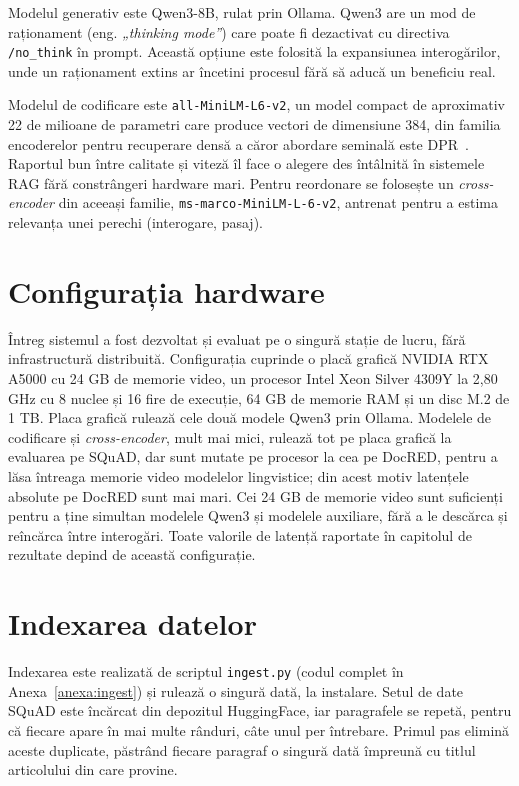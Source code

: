 Modelul generativ este Qwen3-8B, rulat prin Ollama. Qwen3 are un mod de raționament (eng. \textit{„thinking mode”}) care poate fi dezactivat cu directiva \texttt{/no\_think} în prompt. Această opțiune este folosită la expansiunea interogărilor, unde un raționament extins ar încetini procesul fără să aducă un beneficiu real.

Modelul de codificare este \texttt{all-MiniLM-L6-v2}, un model compact de aproximativ 22 de milioane de parametri care produce vectori de dimensiune 384, din familia encoderelor pentru recuperare densă a căror abordare seminală este DPR~\cite{karpukhin2020dpr}. Raportul bun între calitate și viteză îl face o alegere des întâlnită în sistemele RAG fără constrângeri hardware mari. Pentru reordonare se folosește un \textit{cross-encoder} din aceeași familie, \texttt{ms-marco-MiniLM-L-6-v2}, antrenat pentru a estima relevanța unei perechi (interogare, pasaj).

\section{Configurația hardware}
\label{sec:hardware}

Întreg sistemul a fost dezvoltat și evaluat pe o singură stație de lucru, fără infrastructură distribuită. Configurația cuprinde o placă grafică NVIDIA RTX A5000 cu 24 GB de memorie video, un procesor Intel Xeon Silver 4309Y la 2,80 GHz cu 8 nuclee și 16 fire de execuție, 64 GB de memorie RAM și un disc M.2 de 1 TB. Placa grafică rulează cele două modele Qwen3 prin Ollama. Modelele de codificare și \textit{cross-encoder}, mult mai mici, rulează tot pe placa grafică la evaluarea pe SQuAD, dar sunt mutate pe procesor la cea pe DocRED, pentru a lăsa întreaga memorie video modelelor lingvistice; din acest motiv latențele absolute pe DocRED sunt mai mari. Cei 24 GB de memorie video sunt suficienți pentru a ține simultan modelele Qwen3 și modelele auxiliare, fără a le descărca și reîncărca între interogări. Toate valorile de latență raportate în capitolul de rezultate depind de această configurație.

\section{Indexarea datelor}

Indexarea este realizată de scriptul \texttt{ingest.py} (codul complet în Anexa~\ref{anexa:ingest}) și rulează o singură dată, la instalare. Setul de date SQuAD este încărcat din depozitul HuggingFace, iar paragrafele se repetă, pentru că fiecare apare în mai multe rânduri, câte unul per întrebare. Primul pas elimină aceste duplicate, păstrând fiecare paragraf o singură dată împreună cu titlul articolului din care provine.

